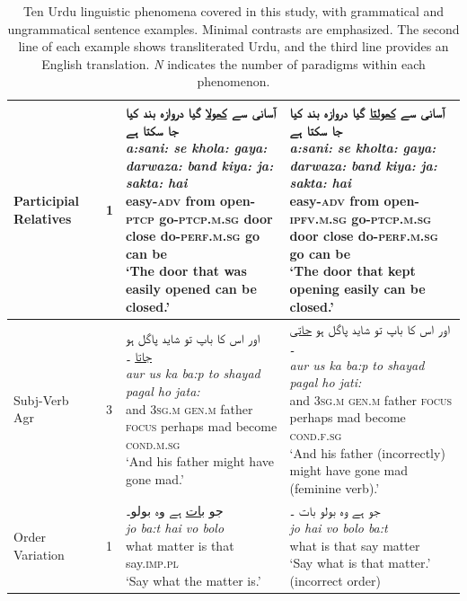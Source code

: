 \documentclass[11pt]{article}
\begin{document}
\begin{table}[ht!]
{\begin{tabular}{llp{9cm}p{9cm}}
\hline
Participial Relatives & 1 &
\parbox[t]{9cm}{
\foreignlanguage{arabic}{آسانی سے \underline{کھولا} گیا دروازہ بند کیا جا سکتا ہے} \\
\textit{a:sani: se khola: gaya: darwaza: band kiya: ja: sakta: hai} \\
easy-\textsc{adv} from open-\textsc{ptcp} go-\textsc{ptcp.m.sg} door close do-\textsc{perf.m.sg} go can be \\
‘The door that was easily opened can be closed.’
}
&
\parbox[t]{9cm}{
\foreignlanguage{arabic}{آسانی سے \underline{کھولتا} گیا دروازہ بند کیا جا سکتا ہے} \\
\textit{a:sani: se kholta: gaya: darwaza: band kiya: ja: sakta: hai} \\
easy-\textsc{adv} from open-\textsc{ipfv.m.sg} go-\textsc{ptcp.m.sg} door close do-\textsc{perf.m.sg} go can be \\
‘The door that kept opening easily can be closed.’
} \\
\hline
       Subj-Verb Agr & 3 & 
  \parbox[t]{9cm}{
\foreignlanguage{arabic}{اور اس کا باپ تو شاید پاگل ہو \underline{جاتا} ۔} \\
\textit{aur us ka ba:p to shayad pagal ho jata:} \\
and 3\textsc{sg.m} \textsc{gen.m} father \textsc{focus} perhaps mad become \textsc{cond.m.sg} \\
‘And his father might have gone mad.’
}
&
\parbox[t]{9cm}{
\foreignlanguage{arabic}{اور اس کا باپ تو شاید پاگل ہو \underline{جاتی} ۔} \\
\textit{aur us ka ba:p to shayad pagal ho jati:} \\
and 3\textsc{sg.m} \textsc{gen.m} father \textsc{focus} perhaps mad become \textsc{cond.f.sg} \\
‘And his father (incorrectly) might have gone mad (feminine verb).’
} \\ \hline

Order Variation& 1 &
\parbox[t]{9cm}{
\foreignlanguage{arabic}{جو \underline{بات} ہے وہ بولو۔} \\
\textit{jo ba:t hai vo bolo} \\
what matter is that say.\textsc{imp.pl} \\
‘Say what the matter is.’
}
&
\parbox[t]{9cm}{
\foreignlanguage{arabic}{جو ہے وہ بولو بات ۔} \\
\textit{jo hai vo bolo ba:t} \\
what is that say matter \\
‘Say what is that matter.’ (incorrect order)
} \\ \hline

    \end{tabular}
    }
    \caption{Ten Urdu linguistic phenomena covered in this study, with grammatical and ungrammatical sentence examples. Minimal contrasts are emphasized. The second line of each example shows transliterated Urdu, and the third line provides an English translation. \textit{N} indicates the number of paradigms within each phenomenon.}
    \label{tab:urdu-phenomena}

\end{table}
\end{document}
